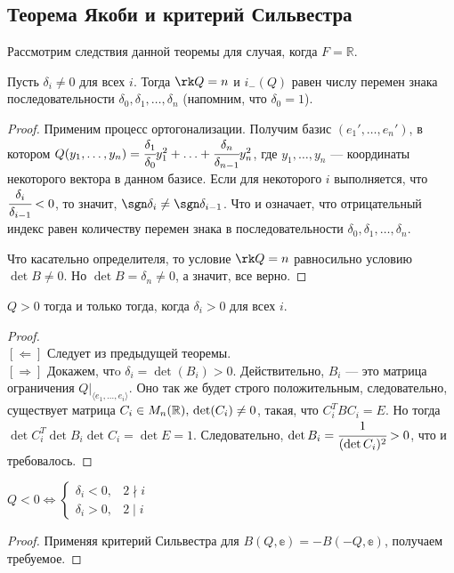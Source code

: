 \subsection*{Теорема Якоби и критерий Сильвестра}

Рассмотрим следствия данной теоремы для случая, когда $F = \mathbb{R}$.
\begin{Theorem}[Якоби]
	Пусть $\delta_i \neq 0$ для всех $i$. Тогда $\rk Q = n$ и $i_{-}(Q)$ равен числу перемен знака последовательности $\delta_0, \delta_1, \ldots, \delta_n$ (напомним, что $\delta_0 = 1$).
\end{Theorem}
\begin{proof}
	Применим процесс ортогонализации. Получим базис $(e_1', \ldots, e_n')$, в котором $ Q(y_1, \ldots, y_n) = \cfrac{\delta_1}{\delta_0}y_1^2 +\ldots + \cfrac{\delta_n}{\delta_{n-1}}y_n^2$, где $y_1, \ldots, y_n$ --- координаты некоторого вектора в данном базисе. Если для некоторого $i$ выполняется, что $\cfrac{\delta_i}{\delta_{i-1}} < 0$, то значит, $\sgn \delta_i \neq \sgn \delta_{i - 1}$. Что и означает, что отрицательный индекс равен количеству перемен знака в последовательности $\delta_0, \delta_1, \ldots, \delta_n$.
	
	Что касательно определителя, то условие  $\rk Q = n$ равносильно условию $\det B \neq 0$. Но $\det B = \delta_n \neq 0$, а значит, все верно.
\end{proof}
\begin{Theorem}
	$Q > 0$ тогда и только тогда, когда $\delta_i > 0$  для всех $i$.
\end{Theorem}
\begin{proof}\ \\
	$[\Leftarrow]$ Следует из предыдущей теоремы. \\
	$[\Rightarrow]$ Докажем, чтo $\delta_i = \det(B_i) > 0$. Действительно, $B_i$ --- это матрица ограничения $Q\bigr|_{\langle e_1, \ldots, e_i\rangle}$. Оно так же будет строго положительным, следовательно,  существует матрица $C_i \in M_n(\mathbb{R}),\\ \det(C_i)\neq 0$, такая, что $C_i^TBC_i = E$. Но тогда
	$\det C^T_i\det B_i \det C_i = \det E = 1$. Следовательно, $\det B_i = \cfrac{1}{(\det C_i)^2} > 0$, что и требовалось.
\end{proof}
\begin{Theorem}
	 $Q < 0 \Leftrightarrow \begin{cases}
		\delta_i < 0, & 2 \nmid i \\
		\delta_i > 0, & 2 \mid i
	\end{cases}$
\end{Theorem}
\begin{proof}
	Применяя критерий Сильвестра для $B(Q, \mathbb{e}) = - B(-Q, \mathbb{e})$, получаем требуемое.
\end{proof}

